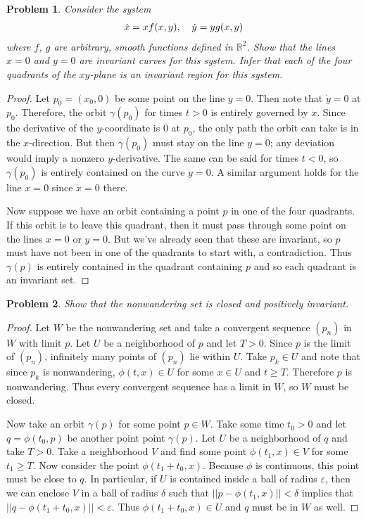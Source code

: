 \documentclass{article}
\newtheorem{problem}{Problem}
\begin{document}
\begin{problem}
Consider the system
\[
\begin{tabular}{cc}
$\dot{x} = xf(x,y)$, & $\dot{y} = yg(x,y)$
\end{tabular}
\]
where $f$, $g$ are arbitrary, smooth functions defined in $\mathbb{R}^2$. Show that the lines $x = 0$ and $y = 0$ are invariant curves for this system. Infer that each of the four quadrants of the $xy$-plane is an invariant region for this system.
\end{problem}
\begin{proof}
Let $p_0 = (x_0, 0)$ be some point on the line $y = 0$. Then note that $\dot{y} = 0$ at $p_0$. Therefore, the orbit $\gamma(p_0)$ for times $t > 0$ is entirely governed by $\dot{x}$. Since the derivative of the $y$-coordinate is $0$ at $p_0$, the only path the orbit can take is in the $x$-direction. But then $\gamma(p_0)$ must stay on the line $y = 0$; any deviation would imply a nonzero $y$-derivative. The same can be said for times $t < 0$, so $\gamma(p_0)$ is entirely contained on the curve $y = 0$. A similar argument holds for the line $x = 0$ since $\dot{x} = 0$ there.

Now suppose we have an orbit containing a point $p$ in one of the four quadrants. If this orbit is to leave this quadrant, then it must pass through some point on the lines $x = 0$ or $y = 0$. But we've already seen that these are invariant, so $p$ must have not been in one of the quadrants to start with, a contradiction. Thus $\gamma(p)$ is entirely contained in the quadrant containing $p$ and so each quadrant is an invariant set.
\end{proof}

\begin{problem}
Show that the nonwandering set is closed and positively invariant.
\end{problem}
\begin{proof}
Let $W$ be the nonwandering set and take a convergent sequence $(p_n)$ in $W$ with limit $p$. Let $U$ be a neighborhood of $p$ and let $T > 0$. Since $p$ is the limit of $(p_n)$, infinitely many points of $(p_n)$ lie within $U$. Take $p_k \in U$ and note that since $p_k$ is nonwandering, $\phi(t,x) \in U$ for some $x \in U$ and $t \geq T$. Therefore $p$ is nonwandering. Thus every convergent sequence has a limit in $W$, so $W$ must be closed.

Now take an orbit $\gamma(p)$ for some point $p \in W$. Take some time $t_0 > 0$ and let $q = \phi(t_0,p)$ be another point point $\gamma(p)$. Let $U$ be a neighborhood of $q$ and take $T > 0$. Take a neighborhood $V$ and find some point $\phi(t_1,x) \in V$ for some $t_1 \geq T$. Now consider the point $\phi(t_1 + t_0,x)$. Because $\phi$ is continuous, this point must be close to $q$. In particular, if $U$ is contained inside a ball of radius $\varepsilon$, then we can enclose $V$ in a ball of radius $\delta$ such that $||p - \phi(t_1, x)|| < \delta$ implies that $||q - \phi(t_1 + t_0,x)|| < \varepsilon$. Thus $\phi(t_1 + t_0, x) \in U$ and $q$ must be in $W$ as well.
\end{proof}
\end{document}
